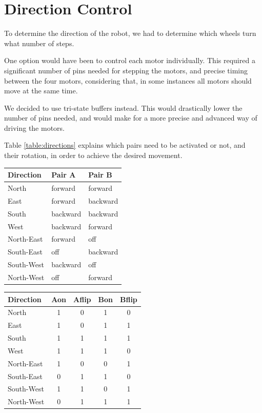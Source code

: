 \section{Direction Control}\label{sec:direction}
To determine the direction of the robot, we had to determine which wheels turn what number of steps. 

One option would have been to control each motor individually. This required a significant number of pins needed for stepping the motors, and precise timing between the four motors, considering that, in some instances all motors should move at the same time.

We decided to use tri-state buffers instead. This would drastically lower the number of pins needed, and would make for a more precise and advanced way of driving the motors.

Table \ref{table:directions} explains which pairs need to be activated or not, and their rotation, in order to achieve the desired movement.

\begin{center}
	\begin{tabular}{|l|l|l|}
		\hline
		Direction & Pair A & Pair B	\\
		\hline
		North & forward & forward \\
		East 	& forward & backward \\
		South & backward & backward \\
		West 	& backward & forward \\
		\hline
		North-East & forward & off \\
		South-East & off & backward \\
		South-West & backward & off\\
		North-West & off & forward \\
		\hline
	\end{tabular}
	\begin{tabular}{|l|c|c|c|c|}
		\hline
		Direction & Aon & Aflip & Bon & Bflip \\
		\hline
		North & 1 & 0 & 1 & 0 \\
		East 	& 1 & 0 & 1 & 1 \\
		South & 1 & 1 & 1 & 1 \\
		West 	& 1 & 1 & 1 & 0 \\
		\hline
		North-East & 1 & 0 & 0 & 1 \\
		South-East & 0 & 1 & 1 & 0 \\
		South-West & 1 & 1 & 0 & 1 \\
		North-West & 0 & 1 & 1 & 1 \\
		\hline
	\end{tabular}
	\label{table:directions}
\end{center}



